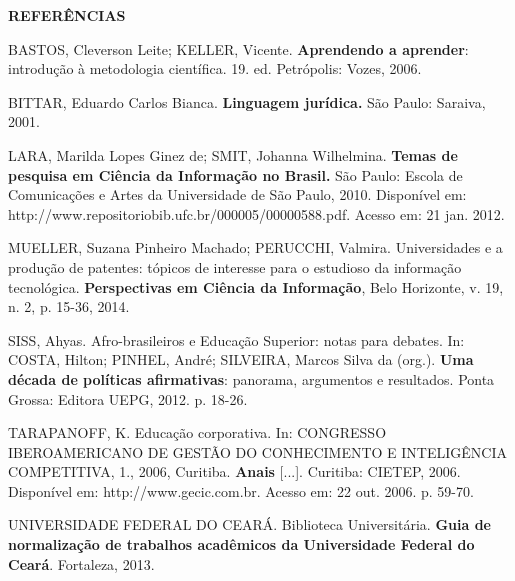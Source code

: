 \begin{center}
    \textbf{REFERÊNCIAS}
\end{center}

\jump

{\parindent0pt %

BASTOS, Cleverson Leite; KELLER, Vicente. \textbf{Aprendendo a aprender}: introdução à metodologia científica. 19. ed. Petrópolis: Vozes, 2006.

\jump

BITTAR, Eduardo Carlos Bianca. \textbf{Linguagem jurídica.} São Paulo: Saraiva, 2001.

\jump

LARA, Marilda Lopes Ginez de; SMIT, Johanna Wilhelmina. \textbf{Temas de pesquisa em Ciência da Informação no Brasil.} São Paulo: Escola de Comunicações e Artes da Universidade de São Paulo, 2010. Disponível em:
http://www.repositoriobib.ufc.br/000005/00000588.pdf. Acesso em: 21 jan. 2012.

\jump

MUELLER, Suzana Pinheiro Machado; PERUCCHI, Valmira. Universidades e a produção de patentes: tópicos de interesse para o estudioso da informação tecnológica. \textbf{Perspectivas em Ciência da Informação}, Belo Horizonte, v. 19, n. 2, p. 15-36, 2014.

\jump

SISS, Ahyas. Afro-brasileiros e Educação Superior: notas para debates. In: COSTA, Hilton; PINHEL, André; SILVEIRA, Marcos Silva da (org.). \textbf{Uma década de políticas afirmativas}: panorama, argumentos e resultados. Ponta Grossa: Editora UEPG, 2012. p. 18-26.

\jump

TARAPANOFF, K. Educação corporativa. In: CONGRESSO IBEROAMERICANO DE
GESTÃO DO CONHECIMENTO E INTELIGÊNCIA COMPETITIVA, 1., 2006, Curitiba.
\textbf{Anais} [...]. Curitiba: CIETEP, 2006. Disponível em: http://www.gecic.com.br. Acesso em: 22 out. 2006. p. 59-70.

\jump

UNIVERSIDADE FEDERAL DO CEARÁ. Biblioteca Universitária. \textbf{Guia de normalização de trabalhos acadêmicos da Universidade Federal do Ceará}. Fortaleza, 2013.

}



